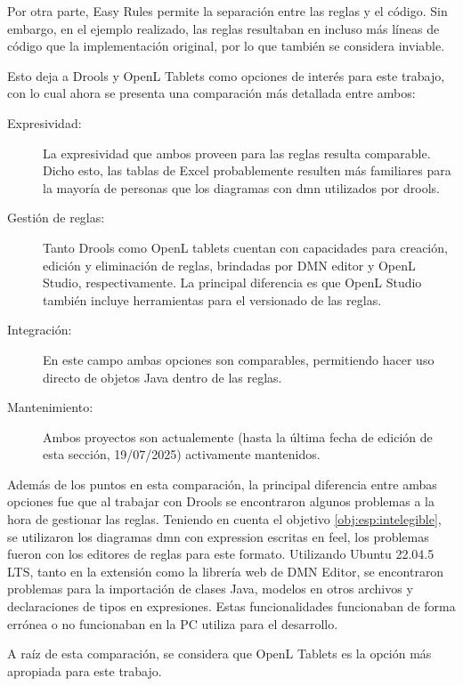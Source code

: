 Por otra parte, Easy Rules permite la separación entre las reglas y el código. Sin embargo, en el ejemplo realizado, las reglas resultaban en incluso más líneas de código que la implementación original, por lo que también se considera inviable.

Esto deja a Drools y OpenL Tablets como opciones de interés para este trabajo, con lo cual ahora se presenta una comparación más detallada entre ambos:

\begin{description}
    \item[Expresividad:] La expresividad que ambos proveen para las reglas resulta comparable. Dicho esto, las tablas de Excel probablemente resulten más familiares para la mayoría de personas que los diagramas con \acrfull{dmn} utilizados por drools.
    \item[Gestión de reglas:] Tanto Drools como OpenL tablets cuentan con capacidades para creación, edición y eliminación de reglas, brindadas por DMN editor y OpenL Studio, respectivamente. La principal diferencia es que OpenL Studio también incluye herramientas para el versionado de las reglas.
    \item[Integración:] En este campo ambas opciones son comparables, permitiendo hacer uso directo de objetos Java dentro de las reglas.
    \item[Mantenimiento:] Ambos proyectos son actualemente (hasta la última fecha de edición de esta sección, 19/07/2025) activamente mantenidos.
\end{description}

Además de los puntos en esta comparación, la principal diferencia entre ambas opciones fue que al trabajar con Drools se encontraron algunos problemas a la hora de gestionar las reglas. Teniendo en cuenta el objetivo \ref{obj:esp:intelegible}, se utilizaron los diagramas \acrshort{dmn} con expression escritas en \acrfull{feel}, los problemas fueron con los editores de reglas para este formato.
Utilizando Ubuntu 22.04.5 LTS, tanto en la extensión como la librería web de DMN Editor, se encontraron problemas para la importación de clases Java, modelos en otros archivos y declaraciones de tipos en expresiones. Estas funcionalidades funcionaban de forma errónea o no funcionaban en la PC utiliza para el desarrollo.

A raíz de esta comparación, se considera que OpenL Tablets es la opción más apropiada para este trabajo.
